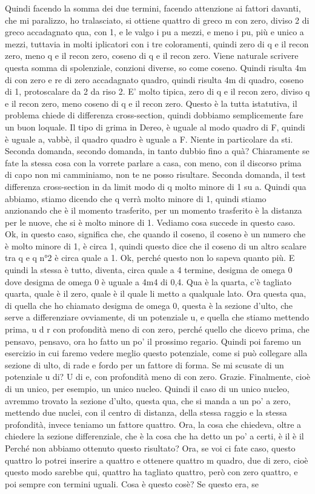 \begin{soluzione}
{   Quindi facendo la somma dei due termini, facendo attenzione ai fattori davanti, che mi paralizzo, ho tralasciato, si ottiene quattro di greco m con zero, diviso 2 di greco accadagnato qua, con 1, e le valgo i pu a mezzi, e meno i pu, più e unico a mezzi, tuttavia in molti iplicatori con i tre coloramenti, quindi zero di q e il recon zero, meno q e il recon zero, coseno di q e il recon zero. Viene naturale scrivere questa somma di spolenziale, conzioni diverse, so come coseno. Quindi risulta 4m di con zero e re di zero accadagnato quadro, quindi risulta 4m di quadro, coseno di 1, protoscalare da 2 da riso 2. E' molto tipica, zero di q e il recon zero, diviso q e il recon zero, meno coseno di q e il recon zero. Questo è la tutta istatutiva, il problema chiede di differenza cross-section, quindi dobbiamo semplicemente fare un buon loquale. Il tipo di grima in Dereo, è uguale al modo quadro di F, quindi è uguale a, vabbè, il quadro quadro è uguale a F. Niente in particolare da sti. Seconda domanda, secondo domanda, in tanto dubbio fino a quà? Chiaramente se fate la stessa cosa con la vorrete parlare a casa, con meno, con il discorso prima di capo non mi camminiamo, non te ne posso risultare. Seconda domanda, il test differenza cross-section in da limit modo di q molto minore di 1 su a. Quindi qua abbiamo, stiamo dicendo che q verrà molto minore di 1, quindi stiamo anzionando che è il momento trasferito, per un momento trasferito è la distanza per le nuove, che si è molto minore di 1. Vediamo cosa succede in questo caso. Ok, in questo caso, significa che, che quando il coseno, il coseno è un numero che è molto minore di 1, è circa 1, quindi questo dice che il coseno di un altro scalare tra q e q n°2 è circa quale a 1. Ok, perché questo non lo sapeva quanto più. E quindi la stessa è tutto, diventa, circa quale a 4 termine, desigma de omega 0 dove desigma de omega 0 è uguale a 4m4 di 0,4. Qua è la quarta, c'è tagliato quarta, quale è il zero, quale è il quale li metto a qualquale lato. Ora questa qua, di quella che ho chiamato desigma de omega 0, questa è la sezione d'ulto, che serve a differenziare ovviamente, di un potenziale u, e quella che stiamo mettendo prima, u d r con profondità meno di con zero, perché quello che dicevo prima, che pensavo, pensavo, ora ho fatto un po' il prossimo regario. Quindi poi faremo un esercizio in cui faremo vedere meglio questo potenziale, come si può collegare alla sezione di ulto, di rade e fordo per un fattore di forma. Se mi scusate di un potenziale u di? U di e, con profondità meno di con zero. Grazie. Finalmente, cioè di un unico, per esempio, un unico nucleo. Quindi il caso di un unico nucleo, avremmo trovato la sezione d'ulto, questa qua, che si manda a un po' a zero, mettendo due nuclei, con il centro di distanza, della stessa raggio e la stessa profondità, invece teniamo un fattore quattro. Ora, la cosa che chiedeva, oltre a chiedere la sezione differenziale, che è la cosa che ha detto un po' a certi, è il è il Perché non abbiamo ottenuto questo risultato? Ora, se voi ci fate caso, questo quattro lo potrei inserire a quattro e ottenere quattro m quadro, due di zero, cioè questo modo sarebbe qui, quattro ha tagliato quattro, però con zero quattro, e poi sempre con termini uguali. Cosa è questo cosè? Se questo era, se }
\end{soluzione}
